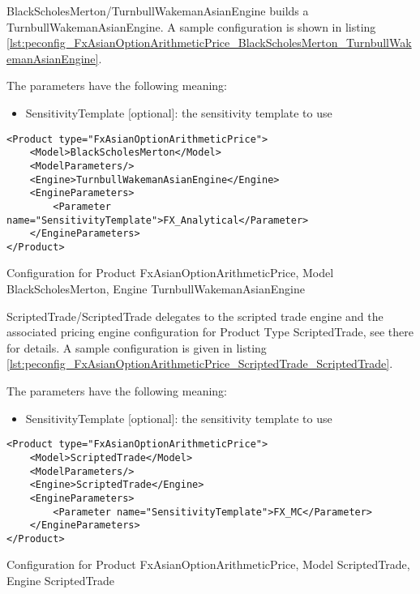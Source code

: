 BlackScholesMerton/TurnbullWakemanAsianEngine builds a TurnbullWakemanAsianEngine. A sample configuration is shown in
listing \ref{lst:peconfig_FxAsianOptionArithmeticPrice_BlackScholesMerton_TurnbullWakemanAsianEngine}.

The parameters have the following meaning:

\begin{itemize}
\item SensitivityTemplate [optional]: the sensitivity template to use 
\end{itemize}

\begin{longlisting}
\begin{verbatim}
<Product type="FxAsianOptionArithmeticPrice">
    <Model>BlackScholesMerton</Model>
    <ModelParameters/>
    <Engine>TurnbullWakemanAsianEngine</Engine>
    <EngineParameters>
        <Parameter name="SensitivityTemplate">FX_Analytical</Parameter>
    </EngineParameters>
</Product>
\end{verbatim}
\caption{Configuration for Product FxAsianOptionArithmeticPrice, Model BlackScholesMerton, Engine TurnbullWakemanAsianEngine}
\label{lst:peconfig_FxAsianOptionArithmeticPrice_BlackScholesMerton_TurnbullWakemanAsianEngine}
\end{longlisting}

ScriptedTrade/ScriptedTrade delegates to the scripted trade engine and the associated pricing engine configuration for
Product Type ScriptedTrade, see there for details. A sample configuration is given in listing
\ref{lst:peconfig_FxAsianOptionArithmeticPrice_ScriptedTrade_ScriptedTrade}.

The parameters have the following meaning:

\begin{itemize}
\item SensitivityTemplate [optional]: the sensitivity template to use 
\end{itemize}

\begin{longlisting}
\begin{verbatim}
<Product type="FxAsianOptionArithmeticPrice">
    <Model>ScriptedTrade</Model>
    <ModelParameters/>
    <Engine>ScriptedTrade</Engine>
    <EngineParameters>
        <Parameter name="SensitivityTemplate">FX_MC</Parameter>
    </EngineParameters>
</Product>
\end{verbatim}
\caption{Configuration for Product FxAsianOptionArithmeticPrice, Model ScriptedTrade, Engine ScriptedTrade}
\label{lst:peconfig_FxAsianOptionArithmeticPrice_ScriptedTrade_ScriptedTrade}
\end{longlisting}


